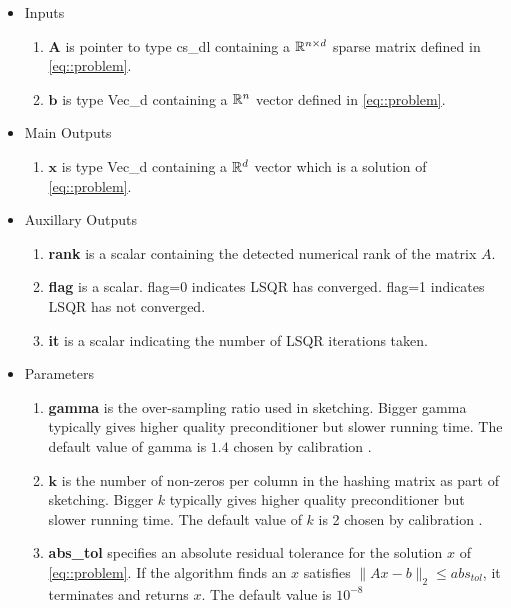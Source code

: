 \documentclass[english,11pt]{article}
\begin{document}
	\begin{itemize}
	\setlength\itemsep{-0.5em}
	\item Inputs 
		\begin{enumerate}
			\item $\mathbf A$ is pointer to type cs_dl containing a $\mathbb{R}^{n \times d}$ sparse matrix defined in \eqref{eq::problem}.
			\item $\mathbf b$ is type Vec_d containing a $\mathbb{R}^n$ vector defined in \eqref{eq::problem}.
		\end{enumerate}
	
	\item Main Outputs
		\begin{enumerate}
			\item {$\mathbf x$} is type Vec_d containing a $\mathbb{R}^d$ vector which is a solution of \eqref{eq::problem}.
		\end{enumerate}

	\item Auxillary Outputs
		\begin{enumerate}
			\item {\bf rank} is a scalar containing the detected numerical rank of the matrix $A$. 
			\item {\bf flag} is a scalar. flag=0 indicates LSQR has converged. flag=1 indicates LSQR has not converged. 
			\item {\bf it} is a scalar indicating the number of LSQR iterations taken. 
		\end{enumerate}
		

	\item Parameters
		\begin{enumerate}
			\item {\bf gamma} is the over-sampling ratio used in sketching. Bigger gamma typically gives higher quality preconditioner but slower running time. The default value of gamma is $1.4$ chosen by calibration \cite{Zhen:OpOnline}.

			\item $\mathbf k$ is the number of non-zeros per column in the hashing matrix as part of sketching. Bigger $k$ typically gives higher quality preconditioner but slower running time. The default value of $k$ is 2 chosen by calibration \cite{Zhen:OpOnline}.

			\item {\bf abs_tol} specifies an absolute residual tolerance for the solution $x$ of \ref{eq::problem}. If the algorithm finds an $x$ satisfies $\|Ax-b\|_2 \leq abs_{tol}$, it terminates and returns $x$. The default value is $10^{-8}$


\end{enumerate}
\end{itemize}
\end{document}
